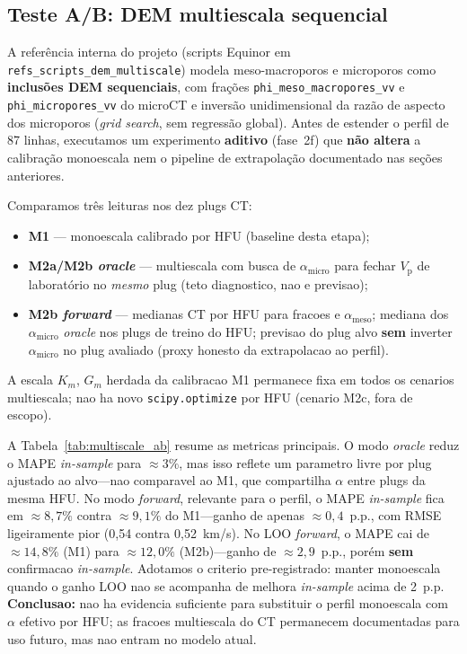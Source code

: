 \documentclass[11pt,a4paper]{article}
\numberwithin{equation}{section}
\newcommand{\Vp}{\ensuremath{V_{\mathrm{p}}}}
\begin{document}
\subsection{Teste A/B: DEM multiescala sequencial}
\label{sec:multiscale_ab}

A referência interna do projeto (scripts Equinor em
\texttt{refs\_scripts\_dem\_multiscale}) modela meso-macroporos e
microporos como \textbf{inclusões DEM sequenciais}, com frações
\texttt{phi\_meso\_macropores\_vv} e \texttt{phi\_micropores\_vv} do
microCT e inversão unidimensional da razão de aspecto dos microporos
(\emph{grid search}, sem regressão global).
Antes de estender o perfil de 87 linhas, executamos um experimento
\textbf{aditivo} (fase~2f) que \textbf{não altera} a calibração monoescala
nem o pipeline de extrapolação documentado nas seções anteriores.

Comparamos três leituras nos dez plugs CT:
\begin{itemize}
  \item \textbf{M1} --- monoescala calibrado por HFU (baseline desta etapa);
  \item \textbf{M2a/M2b \emph{oracle}} --- multiescala com busca de
        $\alpha_{\mathrm{micro}}$ para fechar \Vp{} de laboratório no
        \emph{mesmo} plug (teto diagnostico, nao e previsao);
  \item \textbf{M2b \emph{forward}} --- medianas CT por HFU para fracoes e
        $\alpha_{\mathrm{meso}}$; mediana dos $\alpha_{\mathrm{micro}}$
        \emph{oracle} nos plugs de treino do HFU; previsao do plug alvo
        \textbf{sem} inverter $\alpha_{\mathrm{micro}}$ no plug avaliado
        (proxy honesto da extrapolacao ao perfil).
\end{itemize}

A escala $K_m$, $G_m$ herdada da calibracao M1 permanece fixa em todos os
cenarios multiescala; nao ha novo \texttt{scipy.optimize} por HFU
(cenario M2c, fora de escopo).

A Tabela~\ref{tab:multiscale_ab} resume as metricas principais.
O modo \emph{oracle} reduz o MAPE \emph{in-sample} para $\approx 3\%$,
mas isso reflete um parametro livre por plug ajustado ao alvo---nao
comparavel ao M1, que compartilha $\alpha$ entre plugs da mesma HFU.
No modo \emph{forward}, relevante para o perfil, o MAPE \emph{in-sample}
fica em $\approx 8{,}7\%$ contra $\approx 9{,}1\%$ do M1---ganho de apenas
$\approx 0{,}4$~p.p., com RMSE ligeiramente pior (0,54 contra 0,52~km/s).
No LOO \emph{forward}, o MAPE cai de $\approx 14{,}8\%$ (M1) para
$\approx 12{,}0\%$ (M2b)---ganho de $\approx 2{,}9$~p.p., porém
\textbf{sem} confirmacao \emph{in-sample}.
Adotamos o criterio pre-registrado: manter monoescala quando o ganho LOO
nao se acompanha de melhora \emph{in-sample} acima de 2~p.p.
\textbf{Conclusao:} nao ha evidencia suficiente para substituir o perfil
monoescala com $\alpha$ efetivo por HFU; as fracoes multiescala do CT
permanecem documentadas para uso futuro, mas nao entram no modelo atual.
\end{document}
